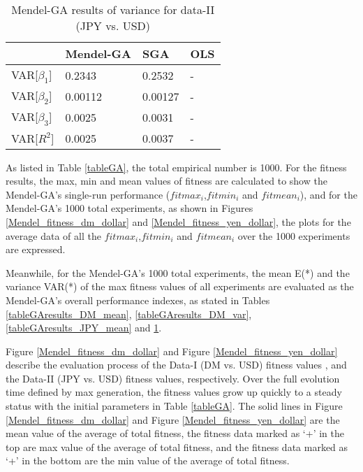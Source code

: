 \begin{table}[h!]
\caption{ Mendel-GA results of variance for data-II (JPY vs. USD) } %
\centering %
\begin{tabular}{llll}
\hline
                 & Mendel-GA  & SGA        & OLS \\
\hline
VAR[$\beta_1$]   & 0.2343     & 0.2532     &  -\\
VAR[$\beta_2$]   & 0.00112    & 0.00127    &  - \\
VAR[$\beta_3$]   & 0.0025     & 0.0031     &  - \\
VAR[$R^2$]       & 0.0025     &  0.0037    &  - \\
\hline
\end{tabular}
\label{tableGAresults_JPY_var} %
\end{table}


As listed in Table \ref{tableGA}, the total empirical number is
1000. For the fitness results, the max, min and mean values of
fitness are calculated to show the Mendel-GA's single-run
performance ($fitmax_i$,$fitmin_i$ and $fitmean_i$), and for the
Mendel-GA's 1000 total experiments, as shown in Figures
\ref{Mendel_fitness_dm_dollar} and \ref{Mendel_fitness_yen_dollar},
the plots for the average data of all the $fitmax_i$,$fitmin_i$ and
$fitmean_i$ over the 1000 experiments are expressed.

Meanwhile, for the Mendel-GA's 1000 total experiments, the mean E(*)
and the variance VAR(*) of the max fitness values of all experiments
are evaluated as the Mendel-GA's overall performance indexes, as
stated in Tables \ref{tableGAresults_DM_mean},
\ref{tableGAresults_DM_var}, \ref{tableGAresults_JPY_mean} and
\ref{tableGAresults_JPY_var}.


Figure \ref{Mendel_fitness_dm_dollar} and Figure
\ref{Mendel_fitness_yen_dollar} describe the evaluation process of
the Data-I (DM vs. USD) fitness values , and the Data-II (JPY vs.
USD) fitness values, respectively. Over the full evolution time
defined by max generation, the fitness values grow up quickly to a
steady status with the initial parameters in Table \ref{tableGA}.
The solid lines in Figure \ref{Mendel_fitness_dm_dollar} and Figure
\ref{Mendel_fitness_yen_dollar} are the mean value of the average of
total fitness, the fitness data marked as `+' in the top are max
value of the average of total fitness, and the fitness data marked
as `+' in the bottom are the min value of the average of total
fitness.

